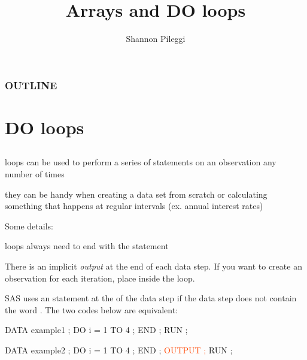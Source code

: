 



\title[Lecture 8]{Arrays and DO loops}
\author[Pileggi]{Shannon Pileggi}


\date{}




\begin{frame}
\titlepage
\end{frame}

\begin{frame}
\frametitle{OUTLINE\qquad\qquad\qquad} \tableofcontents[hideallsubsections]
\end{frame}



\section[DO loops]{DO loops}
\subsection{}
\begin{frame}
\bi
\item {} loops can be used to perform a series of statements on an observation any number of times
\item they can be handy when creating a data set from scratch or calculating something that happens at regular intervals (ex. annual interest rates)
\item Some details:
\bi
\item {} loops always need to end with the statement 
\item There is an implicit \emph{output} at the end of each data step.  If you want to create an observation for each iteration, place  inside the  loop.
\ei
\ei
\end{frame}

\begin{frame}[fragile]
SAS uses an   statement at the  of the data step  if the data step does not contain the word .  The two codes below are equivalent:
\vskip10pt
\footnotesize
{}
\footnotesize
\begin{code}{.0}
DATA example1 ;
    DO i = 1 TO 4 ;
    END ;
RUN ;

\end{code}
\emp
{}
\hspace*{0.05in}
\emp
{}
\footnotesize
\begin{code}{.0}
DATA example2 ;
    DO i = 1 TO 4 ;
    END ;
    \textcolor{OrangeRed}{OUTPUT ;}
RUN ;
\end{code}
\emp
\end{frame}



